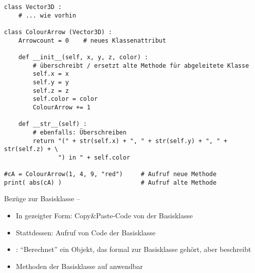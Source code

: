 \begin{frame}[fragile]
%
\begin{codebox}
\begin{verbatim}
class Vector3D :
    # ... wie vorhin

class ColourArrow (Vector3D) :
    Arrowcount = 0    # neues Klassenattribut
    
    def __init__(self, x, y, z, color) :
        # überschreibt / ersetzt alte Methode für abgeleitete Klasse
        self.x = x
        self.y = y
        self.z = z
        self.color = color
        ColourArrow += 1
    
    def __str__(self) :
        # ebenfalls: Überschreiben
        return "(" + str(self.x) + ", " + str(self.y) + ", " + str(self.z) + \
               ") in " + self.color

#cA = ColourArrow(1, 4, 9, "red")     # Aufruf neue Methode
print( abs(cA) )                      # Aufruf alte Methode
\end{verbatim}
\end{codebox}
%
\end{frame}


\begin{frame}[fragile]{Bezüge zur Basisklasse -- }
%
\begin{itemize}
\item In gezeigter Form: Copy\&Paste-Code von der Basisklasse
\item Stattdessen: Aufruf von Code der Basisklasse
\item {}: \enquote{Berechnet} ein Objekt, das formal zur Basisklasse gehört, aber  beschreibt
\item[\Thus] Methoden der Basisklasse auf \inPy{self} anwendbar
\end{itemize}
%
\end{frame}


